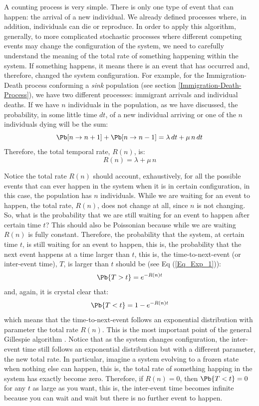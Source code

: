 A counting process is very simple. There is only one type of event that can happen: the arrival of a new individual. We already defined processes where, in addition, individuals can die or reproduce. In order to apply this algorithm, generally, to more complicated stochastic processes where different competing events may change the configuration of the system, we need to carefully understand the meaning of the total rate of something happening within the system. If something happens, it means there is an event that has occurred and, therefore, changed the system configuration. For example, for the Immigration-Death process conforming a \textit{sink} population (see section \ref{Immigration-Death-Process}), we have two different processes: immigrant arrivals and individual deaths. If we have $n$ individuals in the population, as we have discussed, the probability, in some little time $dt$, of a new individual arriving or one of the $n$ individuals dying will be the sum:
\begin{equation} 
\Pb[n \rightarrow n+1] + \Pb[n \rightarrow n-1] = \lambda\,dt + \mu \, n \,dt
\end{equation}
Therefore, the total temporal rate, $R(n)$, is:
\begin{equation} 
R(n) = \lambda + \mu \, n
\end{equation}
\smallskip

Notice the total rate $R(n)$ should account, exhaustively, for all the possible events that can ever happen in the system when it is in certain configuration, in this case, the population has $n$ individuals. While we are waiting for an event to happen, the total rate, $R(n)$, does not change at all, since $n$ is not changing. So, what is the probability that we are still waiting for an event to happen after certain time $t$? This should also be Poissonian because while we are waiting $R(n)$ is fully constant. Therefore, the probability that the system, at certain time $t$, is still waiting for an event to happen, this is, the probability that the next event happens at a time larger than $t$, this is, the time-to-next-event (or inter-event time), $T$, is larger than $t$ should be (see Eq (\ref{Eq_Exp_1})):
\begin{equation}
\Pb\{T>t\} =  e^{-R(n) t}
\end{equation}
and, again, it is crystal clear that:
\begin{equation}
\Pb\{T<t\} =  1 - e^{-R(n) t}
\end{equation}
which means that the time-to-next-event follows an exponential distribution with parameter the total rate $R(n)$. This is the most important point of the general Gillespie algorithm \citep{Gillespie76}. Notice that as the system changes configuration, the inter-event time still follows an exponential distribution but with a different parameter, the new total rate. In particular, imagine a system evolving to a frozen state when nothing else can happen, this is, the total rate of something happing in the system has exactly become zero. Therefore, if $R(n) = 0$, then $\Pb\{T<t\} = 0$ for any $t$ as large as you want, this is, the inter-event time becomes infinite because you can wait and wait but there is no further event to happen.  
\smallskip

